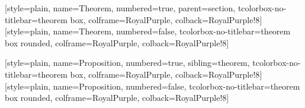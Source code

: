 
\usepackage{amsmath,amsthm,amssymb}
\usepackage{mathtools}
\usepackage{mathrsfs}
\usepackage{bm}
\usepackage{extarrows}
\usepackage[a4paper, margin=1in]{geometry}
\usepackage{float}
\usepackage{indentfirst}
\usepackage{booktabs,multirow}
\usepackage[shortlabels,inline]{enumitem}
\usepackage{appendix}

\usepackage[dvipsnames]{xcolor}
\usepackage{pifont}
\usepackage{graphicx}
\graphicspath{
    {./figure/}{./figures/}{./image/}{./images/}{./graphic/}{./graphics/}{./picture/}{./pictures/}
}
\usepackage{subcaption}

\usepackage[ruled,linesnumbered,noline]{algorithm2e}
\usepackage{listings}
\lstset{style=simpleStyle}

\usepackage{hyperref}
\hypersetup{
    colorlinks=true,linkcolor=,urlcolor=cyan
}

\renewcommand*{\proofname}{\normalfont\bfseries Proof}

\usepackage[most]{tcolorbox}
\usepackage{keytheorems}



[style=plain, name=Theorem, numbered=true, parent=section,
    tcolorbox-no-titlebar={theorem box, colframe=RoyalPurple, colback=RoyalPurple!8}]
[style=plain, name=Theorem, numbered=false,
    tcolorbox-no-titlebar={theorem box rounded, colframe=RoyalPurple, colback=RoyalPurple!8}]

[style=plain, name=Proposition, numbered=true, sibling=theorem,
    tcolorbox-no-titlebar={theorem box, colframe=RoyalPurple, colback=RoyalPurple!8}]
[style=plain, name=Proposition, numbered=false,
    tcolorbox-no-titlebar={theorem box rounded, colframe=RoyalPurple, colback=RoyalPurple!8}]

